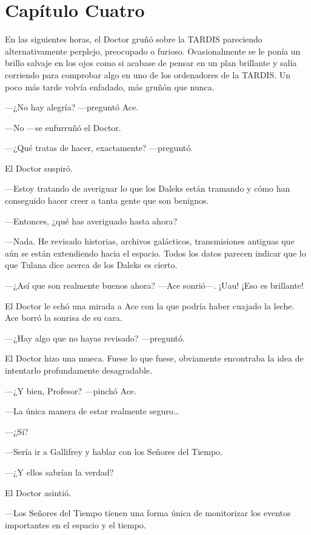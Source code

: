 \chapter*{Capítulo Cuatro}

En las siguientes horas, el Doctor gruñó sobre la TARDIS
pareciendo alternativamente perplejo, preocupado o furioso.
Ocasionalmente se le ponía un brillo salvaje en los ojos como si acabase
de pensar en un plan brillante y salía corriendo para comprobar algo en
uno de los ordenadores de la TARDIS. Un poco más tarde volvía enfadado,
más gruñón que nunca.

---¿No hay alegría? ---preguntó Ace.

---No ---se enfurruñó el Doctor.

---¿Qué tratas de hacer, exactamente? ---preguntó.

El Doctor suspiró.

---Estoy tratando de averiguar lo que los Daleks están tramando
y cómo han conseguido hacer creer a tanta gente que son benignos.

---Entonces, ¿qué has averiguado hasta ahora?

---Nada. He revisado historias, archivos galácticos,
transmisiones antiguas que aún se están extendiendo hacia el espacio.
Todos los datos parecen indicar que lo que Tulana dice acerca de los
Daleks es cierto.

---¿Así que son realmente buenos ahora? ---Ace sonrió---. ¡Uau!
¡Eso es brillante!

El Doctor le echó una mirada a Ace con la que podría haber
cuajado la leche. Ace borró la sonrisa de su cara.

---¿Hay algo que no hayas revisado? ---preguntó.

El Doctor hizo una mueca. Fuese lo que fuese, obviamente
encontraba la idea de intentarlo profundamente desagradable.

---¿Y bien, Profesor? ---pinchó Ace.

---La única manera de estar realmente seguro\ldots{}

---¿Sí?

---Sería ir a Gallifrey y hablar con los Señores del Tiempo.

---¿Y ellos sabrían la verdad?

El Doctor asintió.

---Los Señores del Tiempo tienen una forma única de monitorizar
los eventos importantes en el espacio y el tiempo.

